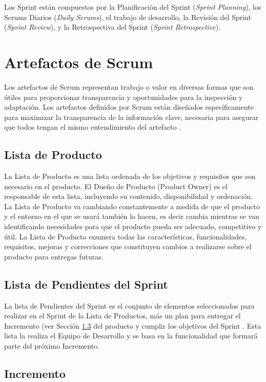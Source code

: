 Los Sprint están compuestos por la Planificación del Sprint (\textit{Sprint Planning}), los Scrums Diarios (\textit{Daily Scrums}), el trabajo de desarrollo, la Revisión del Sprint (\textit{Sprint Review}), y la Retrospectiva del Sprint (\textit{Sprint Retrospective}). 

\section{Artefactos de Scrum}
Los artefactos de Scrum representan trabajo o valor en diversas formas que son útiles para proporcionar transparencia y oportunidades para la inspección y adaptación. Los artefactos definidos por Scrum están diseñados específicamente para maximizar la transparencia de la información clave, necesaria para asegurar que todos tengan el mismo entendimiento del artefacto \cite{scrumSchwaber}.

\subsection{Lista de Producto} \label{productBacklog}
La Lista de Producto es una lista ordenada de los objetivos y requisitos que son necesario en el producto. El Dueño de Producto (Product Owner) es el responsable de esta lista, incluyendo su contenido, disponibilidad y ordenación. La Lista de Producto va cambiando constantemente a medida de que el producto y el entorno en el que se usará también lo hacen, es decir cambia mientras se van identificando necesidades para que el producto pueda ser adecuado, competitivo y útil. La Lista de Producto enumera todas las características, funcionalidades, requisitos, mejoras y correcciones que constituyen cambios a realizarse sobre el producto para entregas futuras. \cite{scrumSchwaber}

\subsection{Lista de Pendientes del Sprint} \label{sprintBacklog}
La lista de Pendientes del Sprint es el conjunto de elementos seleccionados para realizar en el Sprint de la Lista de Productos, más un plan para entregar el Incremento (ver Sección \ref{incremento} del producto y cumplir los objetivos del Sprint \cite{scrumSchwaber}. Esta lista la realiza el Equipo de Desarrollo y se basa en la funcionalidad que formará parte del próximo Incremento.

\subsection{Incremento} \label{incremento}

